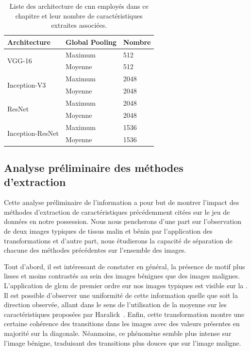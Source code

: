 \begin{table}[H]
    \centering
    \begin{tabular}{lll}
    \toprule
    \textbf{Architecture}               & Global Pooling   & \textbf{Nombre}    \\ \hline
    \multirow{2}{*}{VGG-16}             & Maximum          & 512                \\ \cline{2-3}
                                        & Moyenne          & 512                \\ \hline
    \multirow{2}{*}{Inception-V3}       & Maximum          & 2048               \\ \cline{2-3}
                                        & Moyenne          & 2048               \\ \hline
    \multirow{2}{*}{ResNet}             & Maximum          & 2048               \\ \cline{2-3}
                                        & Moyenne          & 2048               \\ \hline
    \multirow{2}{*}{Inception-ResNet}   & Maximum          & 1536               \\ \cline{2-3}
                                        & Moyenne          & 1536               \\
    \bottomrule
    \end{tabular}
    \caption{Liste des architecture de \gls{cnn} employés dans ce chapitre et leur nombre de caractéristiques extraites associées.}
    \label{tab:number_features_transferlearning}
\end{table}\par

\subsection{Analyse préliminaire des méthodes d'extraction}
Cette analyse préliminaire de l'information a pour but de montrer l'impact des méthodes d'extraction de caractéristiques précédemment citées sur le jeu de données en notre possession. Nous nous pencherons d'une part sur l'observation de deux images typiques de tissus malin et bénin par l'application des transformations et d'autre part, nous étudierons la capacité de séparation de chacune des méthodes précédentes sur l'ensemble des images.\par

Tout d'abord, il est intéressant de constater en général, la présence de motif plus lisses et moins contrastés au sein des images bénignes que des images malignes. L'application de \gls{glcm} de premier ordre sur nos images typiques est visible sur la . Il est possible d'observer une uniformité de cette information quelle que soit la direction observée, allant dans le sens de l'utilisation de la moyenne sur les caractéristiques proposées par Haralick~\cite{Wiltgen2008}. Enfin, cette transformation montre une certaine cohérence des transitions dans les images avec des valeurs présentes en majorité sur la diagonale. Néanmoins, ce phénomène semble plus intense sur l'image bénigne, traduisant des transitions plus douces que sur l'image maligne.\par

